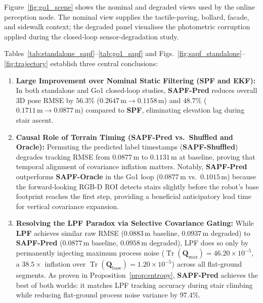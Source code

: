 \documentclass[11pt, a4paper]{article}
\begin{document}
Figure~\ref{fig:go1_scene} shows the nominal and degraded views used by the online perception node. The nominal view supplies the tactile-paving, bollard, facade, and sidewalk context; the degraded panel visualises the photometric corruption applied during the closed-loop sensor-degradation study.

Tables~\ref{tab:standalone_sapf}--\ref{tab:go1_sapf} and Figs.~\ref{fig:sapf_standalone}--\ref{fig:trajectory} establish three central conclusions:
\begin{enumerate}
    \item \textbf{Large Improvement over Nominal Static Filtering (SPF and EKF):} In both standalone and Go1 closed-loop studies, \textbf{SAPF-Pred} reduces overall 3D pose RMSE by $56.3\%$ ($0.2647\,\text{m} \to 0.1158\,\text{m}$) and $48.7\%$ ($0.1711\,\text{m} \to 0.0877\,\text{m}$) compared to \textbf{SPF}, eliminating elevation lag during stair ascent.
    \item \textbf{Causal Role of Terrain Timing (SAPF-Pred vs.\ Shuffled and Oracle):} Permuting the predicted label timestamps (\textbf{SAPF-Shuffled}) degrades tracking RMSE from $0.0877\,\text{m}$ to $0.1131\,\text{m}$ at baseline, proving that temporal alignment of covariance inflation matters. Notably, \textbf{SAPF-Pred} outperforms \textbf{SAPF-Oracle} in the Go1 loop ($0.0877\,\text{m}$ vs.\ $0.1015\,\text{m}$) because the forward-looking RGB-D ROI detects stairs slightly before the robot's base footprint reaches the first step, providing a beneficial anticipatory lead time for vertical covariance expansion.
    \item \textbf{Resolving the LPF Paradox via Selective Covariance Gating:} While \textbf{LPF} achieves similar raw RMSE ($0.0883\,\text{m}$ baseline, $0.0937\,\text{m}$ degraded) to \textbf{SAPF-Pred} ($0.0877\,\text{m}$ baseline, $0.0958\,\text{m}$ degraded), LPF does so only by permanently injecting maximum process noise ($\operatorname{Tr}(\mathbf{Q}_{\max}) = 46.20 \times 10^{-5}$, a $38.5\times$ inflation over $\operatorname{Tr}(\mathbf{Q}_{\text{base}}) = 1.20 \times 10^{-5}$) across all flat-ground segments. As proven in Proposition~\ref{prop:entropy}, \textbf{SAPF-Pred} achieves the best of both worlds: it matches LPF tracking accuracy during stair climbing while reducing flat-ground process noise variance by $97.4\%$.
\end{enumerate}
\end{document}
